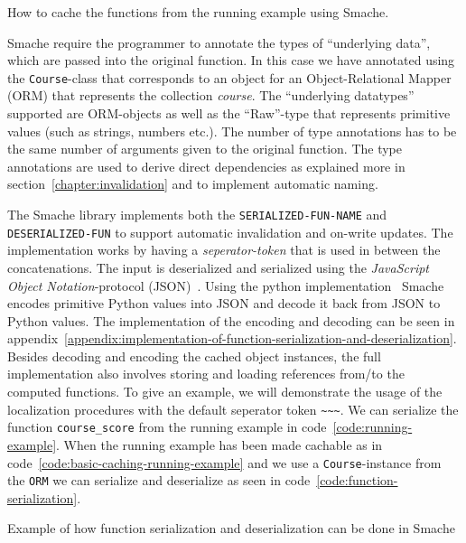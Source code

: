 \begin{code}{How to cache the functions from the running example using Smache.}
  
  \label{code:basic-caching-running-example}
\end{code}

Smache require the programmer to annotate the types of ``underlying data'', which are passed into the original function. In this case we have annotated using the \verb$Course$-class that corresponds to an object for an Object-Relational Mapper (ORM) that represents the collection \emph{course}. The ``underlying datatypes'' supported are ORM-objects as well as the ``Raw''-type that represents primitive values (such as strings, numbers etc.). The number of type annotations has to be the same number of arguments given to the original function. The type annotations are used to derive direct dependencies as explained more in section~\ref{chapter:invalidation} and to implement automatic naming.

The Smache library implements both the \verb$SERIALIZED-FUN-NAME$ and \verb$DESERIALIZED-FUN$ to support automatic invalidation and on-write updates. The implementation works by having a \emph{seperator-token} that is used in between the concatenations. The input is deserialized and serialized using the \emph{JavaScript Object Notation}-protocol (JSON)~\cite{docs:json}. Using the python implementation~\cite{docs:python-json} Smache encodes primitive Python values into JSON and decode it back from JSON to Python values. The implementation of the encoding and decoding can be seen in appendix~\ref{appendix:implementation-of-function-serialization-and-deserialization}. Besides decoding and encoding the cached object instances, the full implementation also involves storing and loading references from/to the computed functions.
To give an example, we will demonstrate the usage of the localization procedures with the default seperator token \verb$~~~$. We can serialize the function \verb$course_score$ from the running example in code~\ref{code:running-example}. When the running example has been made cachable as in code~\ref{code:basic-caching-running-example} and we use a \verb$Course$-instance from the \verb$ORM$ we can serialize and deserialize as seen in code~\ref{code:function-serialization}.

\begin{code}{Example of how function serialization and deserialization can be done in Smache}
  
  \label{code:function-serialization}
\end{code}

